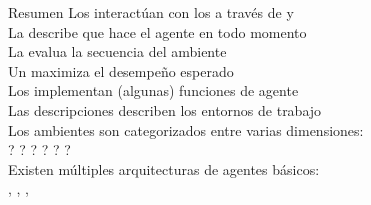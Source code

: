 \begin{frame}{Resumen}{}
Los  interactúan con los  a través de  y \\

La  describe que hace el agente en todo momento\\

La  evalua la secuencia del ambiente\\

Un  maximiza el desempeño esperado\\

Los  implementan (algunas) funciones de agente\\

Las descripciones  describen los entornos de trabajo\\

Los ambientes son categorizados entre varias dimensiones:\\
    ? ? ? ? ? ?\\
   
Existen múltiples arquitecturas de agentes básicos:\\
    , , , 
\end{frame}